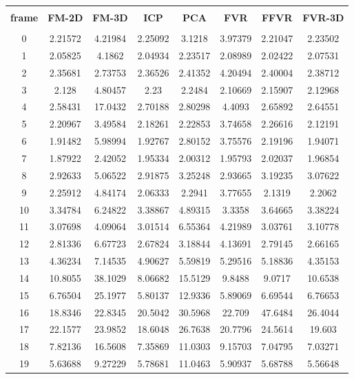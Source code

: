 \begin{center}
\begin{longtable}{cccccccc}
\hline \\
\textbf{frame} & \textbf{FM-2D} & \textbf{FM-3D} & \textbf{ICP} & \textbf{PCA} & \textbf{FVR} & \textbf{FFVR} & \textbf{FVR-3D} \\
\hline \\
0 & 2.21572 & 4.21984 & 2.25092 & 3.1218 & 3.97379 & 2.21047 & 2.23502\\
1 & 2.05825 & 4.1862 & 2.04934 & 2.23517 & 2.08989 & 2.02422 & 2.07531\\
2 & 2.35681 & 2.73753 & 2.36526 & 2.41352 & 4.20494 & 2.40004 & 2.38712\\
3 & 2.128 & 4.80457 & 2.23 & 2.2484 & 2.10669 & 2.15907 & 2.12968\\
4 & 2.58431 & 17.0432 & 2.70188 & 2.80298 & 4.4093 & 2.65892 & 2.64551\\
5 & 2.20967 & 3.49584 & 2.18261 & 2.22853 & 3.74658 & 2.26616 & 2.12191\\
6 & 1.91482 & 5.98994 & 1.92767 & 2.80152 & 3.75576 & 2.19196 & 1.94071\\
7 & 1.87922 & 2.42052 & 1.95334 & 2.00312 & 1.95793 & 2.02037 & 1.96854\\
8 & 2.92633 & 5.06522 & 2.91875 & 3.25248 & 2.93665 & 3.19235 & 3.07622\\
9 & 2.25912 & 4.84174 & 2.06333 & 2.2941 & 3.77655 & 2.1319 & 2.2062\\
10 & 3.34784 & 6.24822 & 3.38867 & 4.89315 & 3.3358 & 3.64665 & 3.38224\\
11 & 3.07698 & 4.09064 & 3.01514 & 6.55364 & 4.21989 & 3.03761 & 3.10778\\
12 & 2.81336 & 6.67723 & 2.67824 & 3.18844 & 4.13691 & 2.79145 & 2.66165\\
13 & 4.36234 & 7.14535 & 4.90627 & 5.59819 & 5.29516 & 5.18836 & 4.35153\\
14 & 10.8055 & 38.1029 & 8.06682 & 15.5129 & 9.8488 & 9.0717 & 10.6538\\
15 & 6.76504 & 25.1977 & 5.80137 & 12.9336 & 5.89069 & 6.69544 & 6.76653\\
16 & 18.8346 & 22.8345 & 20.5042 & 30.5968 & 22.709 & 47.6484 & 26.4044\\
17 & 22.1577 & 23.9852 & 18.6048 & 26.7638 & 20.7796 & 24.5614 & 19.603\\
18 & 7.82136 & 16.5608 & 7.35869 & 11.0303 & 9.15703 & 7.04795 & 7.03271\\
19 & 5.63688 & 9.27229 & 5.78681 & 11.0463 & 5.90937 & 5.68788 & 5.56648\\

\end{longtable}
\end{center}
